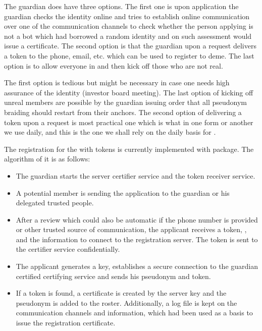 \documentclass[12pt,a4paper]{article}
\renewcommand{\texttt}[1]{\jlinl{#1}}
\begin{document}
The guardian does have three options. The first one is upon application the guardian checks the identity online and tries to establish online communication over one of the communication channels to check whether the person applying is not a bot which had borrowed a random identity and on such assessment would issue a certificate. The second option is that the guardian upon a request delivers a token to the phone, email, etc. which can be used to register to deme. The last option is to allow everyone in and then kick off those who are not real.\par
The first option is tedious but might be necessary in case one needs high assurance of the identity (investor board meeting). The last option of kicking off unreal members are possible by the guardian issuing order that all pseudonym braiding should restart from their anchors. The second option of delivering a token upon a request is most practical one which is what in one form or another we use daily, and this is the one we shall rely on the daily basis for \texttt{DemeNet}.\par
The registration for the \texttt{DemeNet} with tokens is currently implemented with \texttt{Recruiters} package. The algorithm of it is as follows:\par
\begin{itemize}
\setlength{\itemsep}{0pt}
\setlength{\parskip}{0pt}
\item
The guardian starts the server certifier service and the token receiver service.\par
\item
A potential member is sending the application to the guardian or his delegated trusted people.\par
\item
After a review which could also be automatic if the phone number is provided or other trusted source of communication, the applicant receives a token, \texttt{DemeSpec}, and the information to connect to the registration server. The token is sent to the certifier service confidentially.\par
\item
The applicant generates a key, establishes a secure connection to the guardian certified certifying service and sends his pseudonym and token.\par
\item
If a token is found, a certificate is created by the server key and the pseudonym is added to the roster. Additionally, a log file is kept on the communication channels and information, which had been used as a basis to issue the registration certificate.\par
\end{itemize}
\end{document}
